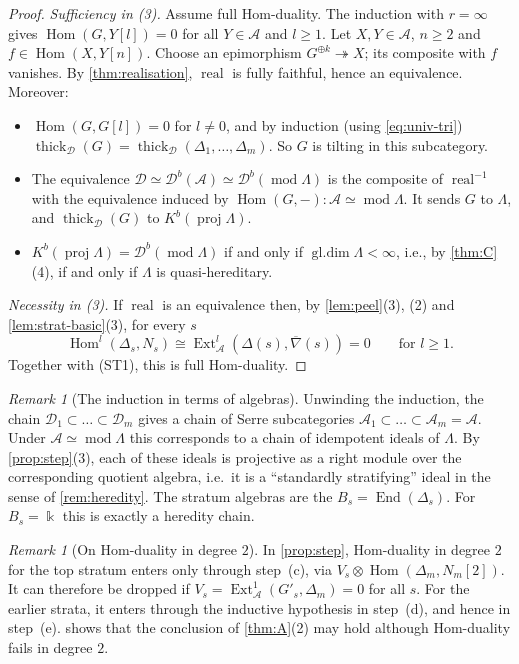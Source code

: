 \documentclass[11pt,reqno]{amsart}
\theoremstyle{plain}
\theoremstyle{definition}
\theoremstyle{remark}
\newtheorem{remark}[theorem]{Remark}
\newcommand{\kk}{\Bbbk}
\DeclareMathOperator{\Hom}{Hom}
\DeclareMathOperator{\End}{End}
\DeclareMathOperator{\Ext}{Ext}
\DeclareMathOperator{\real}{real}
\DeclareMathOperator{\gldim}{gl.dim}
\newcommand{\modd}{\operatorname{mod}}
\newcommand{\proj}{\operatorname{proj}}
\newcommand{\Db}{\mathcal{D}^b}
\newcommand{\Kb}{K^b}
\newcommand{\thick}[2][\cD]{\operatorname{thick}_{#1}(#2)}
\newcommand{\nablabar}{\overline{\nabla}}
\newcommand{\cD}{\mathcal{D}}
\newcommand{\cA}{\mathcal{A}}
\begin{document}
\begin{proof}
\emph{Sufficiency in (3).} Assume full Hom-duality. The induction with $r=\infty$ gives $\Hom(G,Y[l])=0$ for all $Y\in\cA$ and $l\ge1$. Let $X,Y\in\cA$, $n\ge2$ and $f\in\Hom(X,Y[n])$. Choose an epimorphism $G^{\oplus k}\twoheadrightarrow X$; its composite with $f$ vanishes. By \cref{thm:realisation}, $\real$ is fully faithful, hence an equivalence. Moreover:
\begin{itemize}
\item $\Hom(G,G[l])=0$ for $l\ne0$, and by induction (using \eqref{eq:univ-tri}) $\thick G=\thick{\Delta_1,\dots,\Delta_m}$. So $G$ is tilting in this subcategory.
\item The equivalence $\cD\simeq\Db(\cA)\simeq\Db(\modd\Lambda)$ is the composite of $\real^{-1}$ with the equivalence induced by $\Hom(G,-)\colon\cA\simeq\modd\Lambda$. It sends $G$ to $\Lambda$, and $\thick G$ to $\Kb(\proj\Lambda)$.
\item $\Kb(\proj\Lambda)=\Db(\modd\Lambda)$ if and only if $\gldim\Lambda<\infty$, i.e., by \cref{thm:C}(4), if and only if $\Lambda$ is quasi-hereditary.
\end{itemize}

\emph{Necessity in (3).} If $\real$ is an equivalence then, by \cref{lem:peel}(3), (2) and \cref{lem:strat-basic}(3), for every $s$
\[\Hom^l(\Delta_s,N_s)\cong\Ext^l_\cA(\Delta(s),\nablabar(s))=0\qquad\text{for }l\ge1.\]
Together with (ST1), this is full Hom-duality.
\end{proof}

\begin{remark}[The induction in terms of algebras]
Unwinding the induction, the chain $\cD_1\subset\dots\subset\cD_m$ gives a chain of Serre subcategories $\cA_1\subset\dots\subset\cA_m=\cA$. Under $\cA\simeq\modd\Lambda$ this corresponds to a chain of idempotent ideals of $\Lambda$. By \cref{prop:step}(3), each of these ideals is projective as a right module over the corresponding quotient algebra, i.e.\ it is a ``standardly stratifying'' ideal in the sense of \cref{rem:heredity}. The stratum algebras are the $B_s=\End(\Delta_s)$. For $B_s=\kk$ this is exactly a heredity chain.
\end{remark}

\begin{remark}[On Hom-duality in degree $2$]\label{rem:star}
In \cref{prop:step}, Hom-duality in degree $2$ for the top stratum enters only through step~(c), via $V_s\otimes\Hom(\Delta_m,N_m[2])$. It can therefore be dropped if $V_s=\Ext^1_\cA(G'_s,\Delta_m)=0$ for all $s$. For the earlier strata, it enters through the inductive hypothesis in step~(d), and hence in step~(e).  shows that the conclusion of \cref{thm:A}(2) may hold although Hom-duality fails in degree $2$.
\end{remark}
\end{document}
